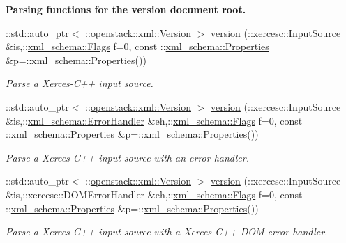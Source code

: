 \begin{Indent}{\bf Parsing functions for the version document root.}
\begin{DoxyCompactItemize}
::std::auto\_\-ptr$<$ ::\hyperlink{classopenstack_1_1xml_1_1Version}{openstack::xml::Version} $>$ \hyperlink{namespaceopenstack_1_1xml_abe04fe22fb0af8ea5413138613300625}{version} (::xercesc::InputSource \&is,::\hyperlink{namespacexml__schema_affb4c227cbd9aa7453dd1dc5a1401943}{xml\_\-schema::Flags} f=0, const ::\hyperlink{namespacexml__schema_ad27ce19a7ee1d3b1064092648898f64c}{xml\_\-schema::Properties} \&p=::\hyperlink{namespacexml__schema_ad27ce19a7ee1d3b1064092648898f64c}{xml\_\-schema::Properties}())
\begin{DoxyCompactList}\small\item\em Parse a Xerces-\/C++ input source. \item\end{DoxyCompactList}\item 
::std::auto\_\-ptr$<$ ::\hyperlink{classopenstack_1_1xml_1_1Version}{openstack::xml::Version} $>$ \hyperlink{namespaceopenstack_1_1xml_a4f86e4107b706b038ea17ba4b07b89d5}{version} (::xercesc::InputSource \&is,::\hyperlink{namespacexml__schema_ab1c9361bfd3b404eaabf0c31eded79dc}{xml\_\-schema::ErrorHandler} \&eh,::\hyperlink{namespacexml__schema_affb4c227cbd9aa7453dd1dc5a1401943}{xml\_\-schema::Flags} f=0, const ::\hyperlink{namespacexml__schema_ad27ce19a7ee1d3b1064092648898f64c}{xml\_\-schema::Properties} \&p=::\hyperlink{namespacexml__schema_ad27ce19a7ee1d3b1064092648898f64c}{xml\_\-schema::Properties}())
\begin{DoxyCompactList}\small\item\em Parse a Xerces-\/C++ input source with an error handler. \item\end{DoxyCompactList}\item 
::std::auto\_\-ptr$<$ ::\hyperlink{classopenstack_1_1xml_1_1Version}{openstack::xml::Version} $>$ \hyperlink{namespaceopenstack_1_1xml_a3fa291d8cfc5c0986f8a0c41912b1937}{version} (::xercesc::InputSource \&is,::xercesc::DOMErrorHandler \&eh,::\hyperlink{namespacexml__schema_affb4c227cbd9aa7453dd1dc5a1401943}{xml\_\-schema::Flags} f=0, const ::\hyperlink{namespacexml__schema_ad27ce19a7ee1d3b1064092648898f64c}{xml\_\-schema::Properties} \&p=::\hyperlink{namespacexml__schema_ad27ce19a7ee1d3b1064092648898f64c}{xml\_\-schema::Properties}())
\begin{DoxyCompactList}\small\item\em Parse a Xerces-\/C++ input source with a Xerces-\/C++ DOM error handler. \item\end{DoxyCompactList}\item 

\end{DoxyCompactItemize}
\end{Indent}
